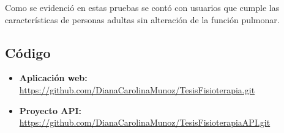 \documentclass[12pt]{article}
\begin{document}
Como se evidenció en estas pruebas se contó con usuarios que cumple las características de personas adultas sin alteración de la función pulmonar. 


\newpage


\subsection{Código}

\begin{itemize}
    \item \textbf{Aplicación web:} \url{https://github.com/DianaCarolinaMunoz/TesisFisioterapia.git}
    \item \textbf{Proyecto API:} \url{https://github.com/DianaCarolinaMunoz/TesisFisioterapiaAPI.git}
\end{itemize}








\newpage
\end{document}
